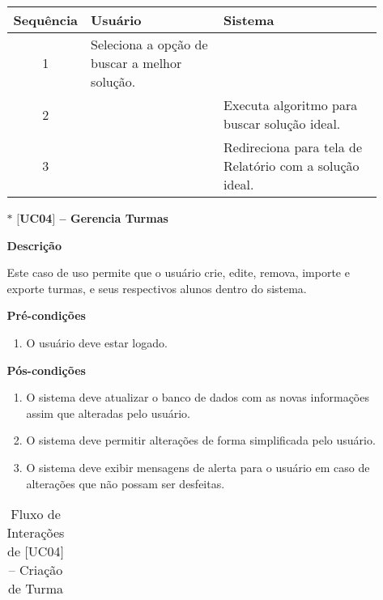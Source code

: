 \begin{itemize}
\begin{itemize}
\begin{table}[H]
\begin{tabular}{c|p{6cm}|p{6cm}}
                \textbf{Sequência} & \textbf{Usuário} & \textbf{Sistema} \\ %
                \hline                               %
                1 & Seleciona a opção de buscar a melhor solução.  &  \\
                2 &   & Executa algoritmo para buscar solução ideal. \\
                3 & & Redireciona para tela de Relatório com a solução ideal.          %
                \\
                \hline
            \end{tabular}
        \end{table}
        
        \item[$\ast$] \textbf{$[$UC04$]$ -- Gerencia Turmas}
        
        \textbf{Descrição}
        
        Este caso de uso permite que o usuário crie, edite, remova, importe e exporte turmas, e seus respectivos alunos dentro do sistema.
        
        \textbf{Pré-condições}
        \begin{enumerate}
            \item  O usuário deve estar logado.
        \end{enumerate}
        
        \textbf{Pós-condições}
        \begin{enumerate}
            \item  O sistema deve atualizar o banco de dados com as novas informações assim que alteradas pelo usuário.
            \item  O sistema deve permitir alterações de forma simplificada pelo usuário.
            \item  O sistema deve exibir mensagens de alerta para o usuário em caso de alterações que não possam ser desfeitas.
        \end{enumerate}
        
       \begin{table}[H]
            \centering
            \caption{Fluxo de Interações de $[$UC04$]$ -- Criação de Turma}
            \vspace{0.5cm}
            \renewcommand\arraystretch{1.5}
            \begin{tabular}{c|p{6cm}|p{6cm}}
             

\end{tabular}
\end{table}
\end{itemize}
\end{itemize}
